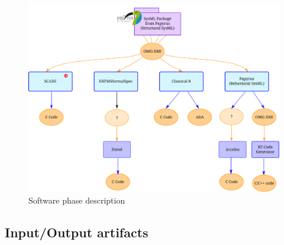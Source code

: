 \begin{figure}[htb]
  \centering
  \includegraphics[width=\textwidth]{images/modeling_phase2}
  \caption{Software phase description}
  \label{fig:softPhase}
\end{figure}

\subsection{Input/Output artifacts}

